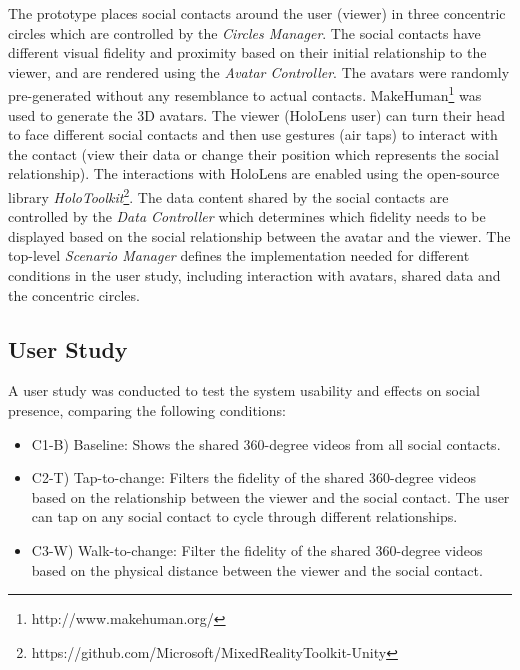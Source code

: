 The prototype places social contacts around the user (viewer) in three concentric circles which are controlled by the \textit{Circles Manager}. The social contacts have different visual fidelity and proximity based on their initial relationship to the viewer, and are rendered using the \textit{Avatar Controller}. The avatars were randomly pre-generated without any resemblance to actual contacts. MakeHuman\footnote{http://www.makehuman.org/} was used to generate the 3D avatars. The viewer (HoloLens user) can turn their head to face different social contacts and then use gestures (air taps) to interact with the contact (view their data or change their position which represents the social relationship). The interactions with HoloLens are enabled using the open-source library \textit{HoloToolkit}\footnote{https://github.com/Microsoft/MixedRealityToolkit-Unity}. The data content shared by the social contacts are controlled by the \textit{Data Controller} which determines which fidelity needs to be displayed based on the social relationship between the avatar and the viewer. The top-level \textit{Scenario Manager} defines the implementation needed for different conditions in the user study, including interaction with avatars, shared data and the concentric circles. 

\subsection{User Study}

A user study was conducted to test the system usability and effects on social presence, comparing the following conditions: 

\begin{itemize}
    \item C1-B) Baseline: Shows the shared 360-degree videos from all social contacts.
    \item C2-T) Tap-to-change: Filters the fidelity of the shared 360-degree videos based on the relationship between the viewer and the social contact. The user can tap on any social contact to cycle through different relationships.
    \item C3-W) Walk-to-change: Filter the fidelity of the shared 360-degree videos based on the physical distance between the viewer and the social contact.
\end{itemize}

